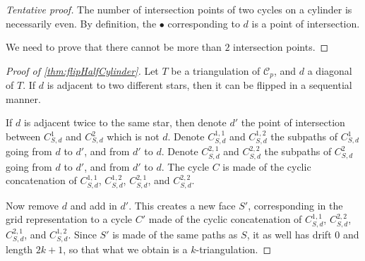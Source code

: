 \documentclass{amsart}
\theoremstyle{remark}
\newcommand{\cylinder}{\mathcal{C}}
\begin{document}
\begin{proof}[Tentative proof]
The number of intersection points of two cycles on a cylinder is necessarily even. By definition, the $\bullet$ corresponding to $d$ is a point of intersection.

We need to prove that there cannot be more than $2$ intersection points.
\end{proof}

\begin{proof}[Proof of \cref{thm:flipHalfCylinder}]
Let $T$ be a triangulation of $\cylinder_p$, and $d$ a diagonal of $T$.
If $d$ is adjacent to two different stars, then it can be flipped in a sequential manner.

If $d$ is adjacent twice to the same star, then denote $d'$ the point of intersection between $C_{S,d}^1$ and $C_{S,d}^2$ which is not $d$.
Denote $C_{S,d}^{1,1}$ and $C_{S,d}^{1,2}$ the subpaths of $C_{S,d}^1$ going from $d$ to $d'$, and from $d'$ to $d$.
Denote $C_{S,d}^{2,1}$ and $C_{S,d}^{2,2}$ the subpaths of $C_{S,d}^2$ going from $d$ to $d'$, and from $d'$ to $d$.
The cycle $C$ is made of the cyclic concatenation of $C_{S,d}^{1,1}$, $C_{S,d}^{1,2}$, $C_{S,d}^{2,1}$, and $C_{S,d}^{2,2}$.

Now remove $d$ and add in $d'$. This creates a new face $S'$, corresponding in the grid representation to a cycle $C'$ made of the cyclic concatenation of $C_{S,d}^{1,1}$, $C_{S,d}^{2,2}$, $C_{S,d}^{2,1}$, and $C_{S,d}^{1,2}$.
Since $S'$ is made of the same paths as $S$, it as well has drift $0$ and length $2k+1$, so that what we obtain is a $k$-triangulation.
\end{proof}




\end{document}
